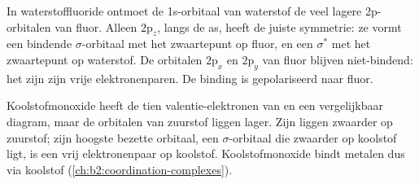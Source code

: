 In waterstoffluoride ontmoet de 1s-orbitaal van waterstof de veel lagere 2p-orbitalen
van fluor. Alleen $2\mathrm p_z$, langs de as, heeft de juiste symmetrie: ze vormt
een bindende $\sigma$-orbitaal met het zwaartepunt op fluor, en een $\sigma^*$ met het zwaartepunt op
waterstof. De orbitalen $2\mathrm p_x$ en $2\mathrm p_y$ van fluor blijven
niet-bindend: het zijn zijn vrije elektronenparen. De binding is gepolariseerd naar fluor.

Koolstofmonoxide heeft de tien valentie-elektronen van  en een vergelijkbaar diagram,
maar de orbitalen van zuurstof liggen lager. Zijn  liggen zwaarder op zuurstof;
zijn hoogste bezette orbitaal, een $\sigma$-orbitaal die zwaarder op koolstof ligt, is een vrij elektronenpaar
op koolstof. Koolstofmonoxide bindt metalen dus via koolstof
(\cref{ch:b2:coordination-complexes}).


